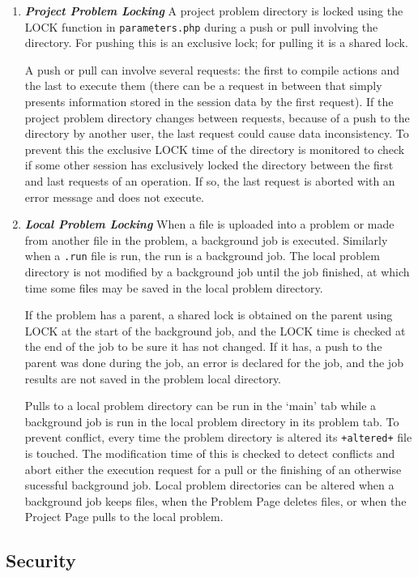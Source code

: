 \documentclass[12pt]{article}
\newcommand{\key}[1]{{\bf \em #1}}
\begin{document}
\begin{enumerate}
\item \key{Project Problem Locking}
A project problem directory is locked using the
LOCK function in {\tt parameters.php}
during a push or pull involving the directory.
For pushing this is an exclusive lock; for pulling it is a shared
lock.

A push or pull can involve several requests:
the first to compile actions and the last to execute them
(there can be a request in between that simply presents
information stored in the session data by the first request).
If the project problem directory changes between requests,
because of a push to the directory by another user, the last
request could cause data inconsistency.  To prevent this
the exclusive LOCK time of the directory is monitored to check if some
other session has exclusively locked the directory between the
first and last requests of an operation.
If so, the last request is aborted with an error message and
does not execute.

\item \key{Local Problem Locking}
When a file is uploaded into a problem or made from another file
in the problem, a background job is executed.
Similarly when a {\tt .run} file is run, the run is a background job.
The local problem directory is not modified by a background job
until the job finished, at which time some files may be saved in
the local problem directory.

If the problem has a parent, a shared lock is
obtained on the parent using LOCK at the start of the background
job, and the LOCK time is checked at the end of the job to be sure
it has not changed.  If it has, a push to the parent was done
during the job, an error is declared for the job,
and the job results are not saved in the problem local directory.


Pulls to a local problem directory can be run in the `main' tab
while a background job is run in the local problem directory in
its problem tab.  To prevent conflict, every time the problem
directory is altered its {\tt +altered+} file is touched.
The modification time of this is checked to detect conflicts
and abort either the execution request for a pull or the
finishing of an otherwise sucessful background job.
Local problem directories can be altered when a background
job keeps files, when the Problem Page deletes files, or when
the Project Page pulls to the local problem.


\end{enumerate}


\subsection{Security}
\end{document}
